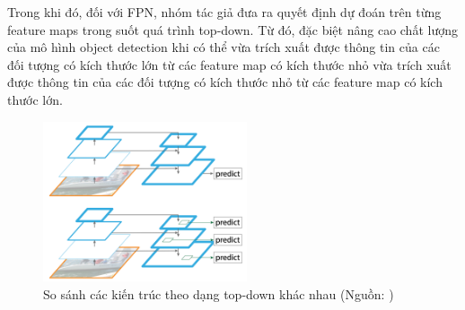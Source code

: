 {    \noindent
    Trong khi đó, đối với FPN, nhóm tác giả đưa ra quyết định dự đoán trên từng feature maps trong suốt quá trình top-down. Từ đó, đặc biệt nâng cao chất lượng của mô hình object detection khi có thể vừa trích xuất được thông tin của các đối tượng có kích thước lớn từ các feature map có kích thước nhỏ vừa trích xuất được thông tin của các đối tượng có kích thước nhỏ từ các feature map có kích thước lớn.

    \begin{figure}[H]
        \centering
        \includegraphics[width=6cm] {images/fpn_topdown}
        \caption{So sánh các kiến trúc theo dạng top-down khác nhau (Nguồn: \cite{lin2017feature})}
        \label{fig:fpn_topdown}
    \end{figure}

}
